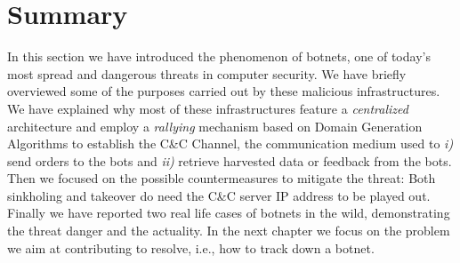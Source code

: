 \section{Summary} %
\label{sec:summary}
In this section we have introduced the phenomenon of botnets, one of today's most
spread and dangerous threats in computer security. We have briefly overviewed some of
the purposes carried out by these malicious infrastructures. We have explained why most
of these infrastructures feature a \emph{centralized} architecture and employ
a \emph{rallying} mechanism based on Domain Generation Algorithms to establish
the C\&C Channel, the communication medium used to \emph{i)} send orders to
the bots and \emph{ii)} retrieve harvested data or feedback from the bots.
Then we focused on the possible countermeasures to mitigate the threat: Both
sinkholing and takeover do need the C\&C server IP address to be played out.
Finally we have reported two real life cases of botnets in the wild, demonstrating
the threat danger and the actuality.
In the next chapter we focus on the problem we aim at contributing to resolve,
i.e., how to track down a botnet.


